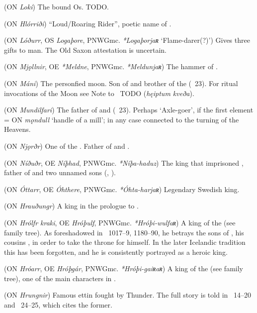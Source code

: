 \begin{itemize}
 (ON \emph{Loki})
  The bound Os. TODO.

 (ON \emph{Hlórriði})
  “Loud/Roaring Rider”, poetic name of .

 (ON \emph{Lóðurr}, OS \emph{Logaþore}, PNWGmc. \emph{*Logaþorjaʀ} ‘Flame-darer(?)’)
  Gives three gifts to man.  The Old Saxon attestation is uncertain.

 (ON \emph{Mjǫllnir}, OE \emph{*Meldne}, PNWGmc. \emph{*Meldunjaʀ})
  The hammer of .

 (ON \emph{Máni})
  The personfied moon.  Son of  and brother of the  (\Vafthrudnismal\ 23).  For ritual invocations of the Moon see Note to \Havamal\ TODO (\emph{hęiptum kveða}).

 (ON \emph{Mundilfari})
  The father of  and  (\Vafthrudnismal\ 23).  Perhaps ‘Axle-goer’, if the first element = ON \emph{mǫndull} ‘handle of a mill’; in any case connected to the turning of the Heavens.

 (ON \emph{Njǫrðr})
  One of the . Father of  and .

 (ON \emph{Níðuðr}, OE \emph{Níþhad}, PNWGmc. \emph{*Níþa-haduz})
  The king that imprisoned , father of  and two unnamed sons (\Volundarkvida, \Deor).

 (ON \emph{Óttarr}, OE \emph{Óhthere}, PNWGmc. \emph{*Óhta-harjaʀ})
  Legendary Swedish king.

 (ON \emph{Hrauðungr})
  A king in the prologue to \Grimnismal.

 (ON \emph{Hrólfr kraki}, OE \emph{Hróþulf}, PNWGmc. \emph{*Hróþi-wulfaʀ})
  A king of the  (see family tree). As foreshadowed in \Beowulf\ 1017–9, 1180–90, he betrays the sons of , his cousins , in order to take the throne for himself. In the later Icelandic tradition this has been forgotten, and he is consistently portrayed as a heroic king.

 (ON \emph{Hróarr}, OE \emph{Hróþgár}, PNWGmc. \emph{*Hróþi-gaiʀaʀ})
  A king of the  (see family tree), one of the main characters in \Beowulf.

 (ON \emph{Hrungnir})
  Famous ettin fought by Thunder.  The full story is told in \Haustlong\ 14–20 and \Skaldskaparmal\ 24–25, which cites the former.


\end{itemize}

